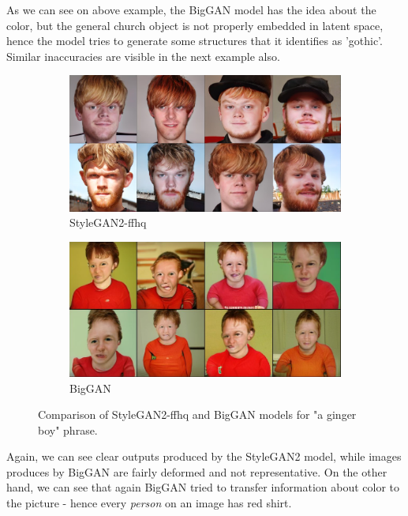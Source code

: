\documentclass[11pt,a4paper,openany]{book}
\begin{document}
\noindent As we can see on above example, the BigGAN model has the idea about the color, but the general church object is not properly embedded in latent space, hence the model tries to generate some structures that it identifies as 'gothic'. Similar inaccuracies are visible in the next example also.

\begin{figure}[H]
\centering
\begin{subfigure}[b]{1.0\textwidth}
   \includegraphics[width=1\linewidth]{gingerboy_stylegan.PNG}
   \caption{StyleGAN2-ffhq}
   \label{fig:Ng1} 
\end{subfigure}

\begin{subfigure}[b]{1.0\textwidth}
   \includegraphics[width=1\linewidth]{gingerboy_biggan.PNG}
   \caption{BigGAN}
   \label{fig:Ng2}
\end{subfigure}
\caption[pics]{Comparison of StyleGAN2-ffhq and BigGAN models for "a ginger boy" phrase.}
\end{figure}

\noindent Again, we can see clear outputs produced by the StyleGAN2 model, while images produces by BigGAN are fairly deformed and not representative. On the other hand, we can see that again BigGAN tried to transfer information about color to the picture - hence every \textit{person} on an image has red shirt.\\
\end{document}
